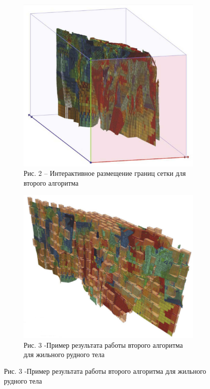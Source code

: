 \begin{figure}[H]
    \centering
    \begin{subfigure}[b]{0.45\textwidth}
        \centering
        \includegraphics[width=\linewidth]{assets/1251}
		\caption*{Рис. 2 -- Интерактивное размещение границ сетки для второго алгоритма}
    \end{subfigure}
    \hfill
    \begin{subfigure}[b]{0.45\textwidth}
        \centering
        \includegraphics[width=\linewidth]{assets/1252}
		\caption*{Рис. 3 -Пример результата работы второго алгоритма для жильного рудного тела}
    \end{subfigure}
\end{figure}

